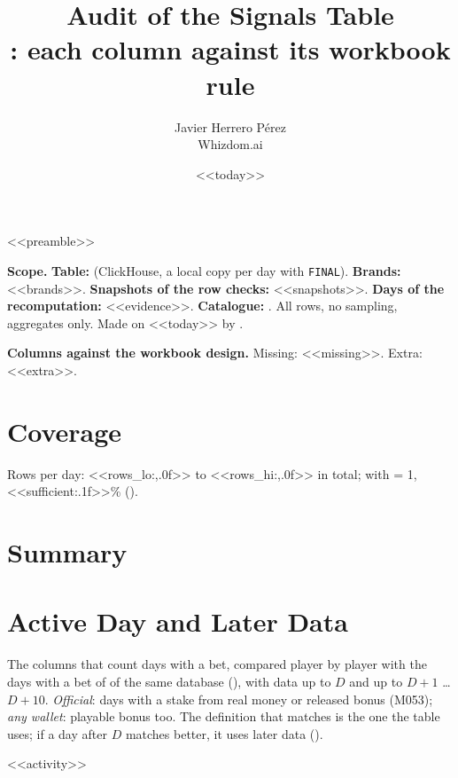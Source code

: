 <<preamble>>
\newcommand{\prioE}{\badge{BrickRed}{ERROR}}
\title{\textbf{Audit of the Signals Table}\\[2pt]\large{}: each column against its workbook rule}
\date{<<today>>}
\author{Javier Herrero Pérez \\ Whizdom.ai}


\maketitle
\vspace{-1.2cm}

\textbf{Scope.} \textbf{Table:}  (ClickHouse, a local copy per day with \texttt{FINAL}). \textbf{Brands:} <<brands>>. \textbf{Snapshots of the row checks:} <<snapshots>>. \textbf{Days of the recomputation:} <<evidence>>. \textbf{Catalogue:} . All rows, no sampling, aggregates only. Made on <<today>> by .

\textbf{Columns against the workbook design.} Missing: <<missing>>. Extra: <<extra>>.

\section{Coverage}
Rows per day: <<rows_lo:,.0f>> to <<rows_hi:,.0f>> in total; with  = 1, <<sufficient:.1f>>\% ().

\section{Summary}
\begin{center}

\end{center}

\section{Active Day and Later Data}
The columns that count days with a bet, compared player by player with the days with a bet of  of the same database (), with data up to $D$ and up to $D+1$ \ldots $D+10$. \emph{Official}: days with a stake from real money or released bonus (M053); \emph{any wallet}: playable bonus too. The definition that matches is the one the table uses; if a day after $D$ matches better, it uses later data ().

<<activity>>

